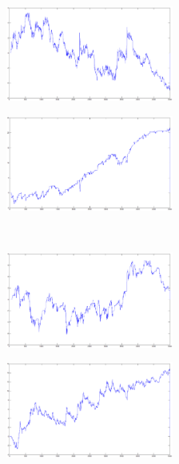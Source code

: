 \documentclass{tewiart}
\begin{document}
\begin{figure}[h]
\centering
\begin{minipage}{\linewidth}
\centering
\includegraphics[width=0.49\textwidth]{images/eurjpyA.eps}
\label{jedno}
\end{minipage}
\begin{minipage}{\linewidth}
\centering
\includegraphics[width=0.49\textwidth]{images/eurjpyB.eps}
\label{dwu}
\end{minipage}
\\
\begin{minipage}{\linewidth}
\centering
\includegraphics[width=0.49\textwidth]{images/eurjpyC.eps}
\label{cztero}
\end{minipage}
\begin{minipage}{\linewidth}
\centering
\includegraphics[width=0.49\textwidth]{images/eurjpyD.eps}
\label{mansard}
\end{minipage}

\end{figure}
\end{document}
